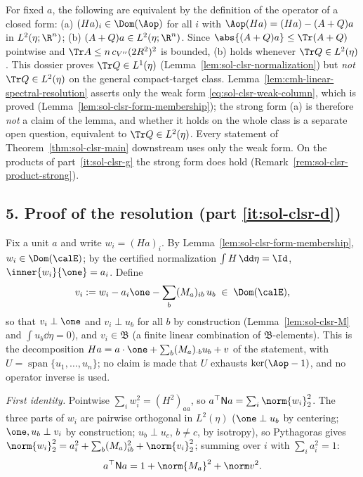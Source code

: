 \documentclass[../main.tex]{subfiles}
\begin{document}
\begin{remark}
\label{rem:sol-clsr-gap}
For fixed $a$, the following are equivalent by the definition of the operator of a closed
form: (a) $(Ha)_i\in\Dom(\Aop)$ for all $i$ with
$\Aop(Ha)=(Ha)-(A+Q)a$ in $L^2(\eta;\R^n)$; (b) $(A+Q)a\in L^2(\eta;\R^n)$.  Since
$\abs{(A+Q)a}\le\Tr(A+Q)$ pointwise and $\Tr A\le n\,c_{V''}(2R^2)^2$ is bounded, (b) holds
whenever $\Tr Q\in L^2(\eta)$.  This dossier proves $\Tr Q\in L^1(\eta)$
(Lemma~\ref{lem:sol-clsr-normalization}) but \emph{not} $\Tr Q\in L^2(\eta)$ on the general
compact-target class.  Lemma~\ref{lem:cmh-linear-spectral-resolution} asserts only the weak
form \eqref{eq:sol-clsr-weak-column}, which is proved (Lemma~\ref{lem:sol-clsr-form-membership});
the strong form (a) is therefore \emph{not} a claim of the lemma, and whether it holds on the
whole class is a separate open question, equivalent to $\Tr Q\in L^2(\eta)$.  Every statement
of Theorem~\ref{thm:sol-clsr-main} downstream uses only the weak form.  On the products of
part~\ref{it:sol-clsr-g} the strong form does hold
(Remark~\ref{rem:sol-clsr-product-strong}).
\end{remark}

\subsection*{5. Proof of the resolution (part \ref{it:sol-clsr-d})}

Fix a unit $a$ and write $w_i=(Ha)_i$.  By Lemma~\ref{lem:sol-clsr-form-membership},
$w_i\in\Dom(\calE)$; by the certified normalization $\int H\,\dd\eta=\Id$,
$\inner{w_i}{\one}=a_i$.  Define
\[
  v_i:=w_i-a_i\one-\sum_b(M_a)_{ib}\,u_b\;\in\;\Dom(\calE),
\]
so that $v_i\perp\one$ and $v_i\perp u_b$ for all $b$ by construction
(Lemma~\ref{lem:sol-clsr-M} and $\int u_b\dd\eta=0$), and $v_i\in\mathfrak B$ (a finite linear
combination of $\mathfrak B$-elements).  This is the decomposition
$Ha=a\cdot\one+\sum_b(M_a)_{\cdot b}u_b+v$ of the statement, with
$U=\operatorname{span}\{u_1,\dots,u_n\}$; no claim is made that $U$ exhausts
$\ker(\Aop-1)$, and no operator inverse is used.

\emph{First identity.}  Pointwise $\sum_iw_i^2=(H^2)_{aa}$, so
$a^\top\mathsf Na=\sum_i\norm{w_i}_2^2$.  The three parts of $w_i$ are pairwise orthogonal in
$L^2(\eta)$ ($\one\perp u_b$ by centering; $\one,u_b\perp v_i$ by construction;
$u_b\perp u_c$, $b\ne c$, by isotropy), so Pythagoras gives
$\norm{w_i}_2^2=a_i^2+\sum_b(M_a)_{ib}^2+\norm{v_i}_2^2$; summing over $i$ with
$\sum_ia_i^2=1$:
\[
  a^\top\mathsf Na=1+\norm{M_a}^2+\norm v^2 .
\]
\end{document}
